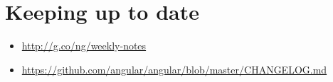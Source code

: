 \section{Keeping up to date}


\begin{itemize}
  \item \url{http://g.co/ng/weekly-notes}
\end{itemize}


\begin{itemize}
  \item \url{https://github.com/angular/angular/blob/master/CHANGELOG.md}
\end{itemize}
